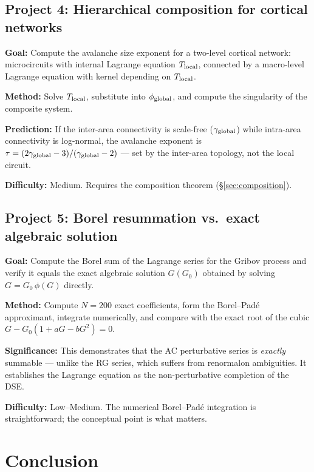 \documentclass[11pt,a4paper]{article}
\theoremstyle{definition}
\begin{document}
\subsection{Project 4: Hierarchical composition for cortical networks}

\textbf{Goal:} Compute the avalanche size exponent for a two-level
cortical network: microcircuits with internal Lagrange equation
$T_{\rm local}$, connected by a macro-level Lagrange equation with
kernel depending on $T_{\rm local}$.

\textbf{Method:} Solve $T_{\rm local}$, substitute into $\phi_{\rm global}$,
and compute the singularity of the composite system.

\textbf{Prediction:} If the inter-area connectivity is scale-free
($\gamma_{\rm global}$) while intra-area connectivity is log-normal,
the avalanche exponent is $\tau = (2\gamma_{\rm global} - 3)/(\gamma_{\rm global} - 2)$
--- set by the inter-area topology, not the local circuit.

\textbf{Difficulty:} Medium. Requires the composition theorem (\S\ref{sec:composition}).

\subsection{Project 5: Borel resummation vs.\ exact algebraic solution}

\textbf{Goal:} Compute the Borel sum of the Lagrange series for the
Gribov process and verify it equals the exact algebraic solution
$G(G_0)$ obtained by solving $G = G_0\,\phi(G)$ directly.

\textbf{Method:} Compute $N = 200$ exact coefficients, form the
Borel--Pad\'e approximant, integrate numerically, and compare with
the exact root of the cubic $G - G_0(1 + aG - bG^2) = 0$.

\textbf{Significance:} This demonstrates that the AC perturbative series
is \emph{exactly} summable --- unlike the RG series, which suffers from
renormalon ambiguities. It establishes the Lagrange equation as the
non-perturbative completion of the DSE.

\textbf{Difficulty:} Low--Medium. The numerical Borel--Pad\'e integration
is straightforward; the conceptual point is what matters.


\section{Conclusion}
\label{sec:conclusion}
\end{document}
